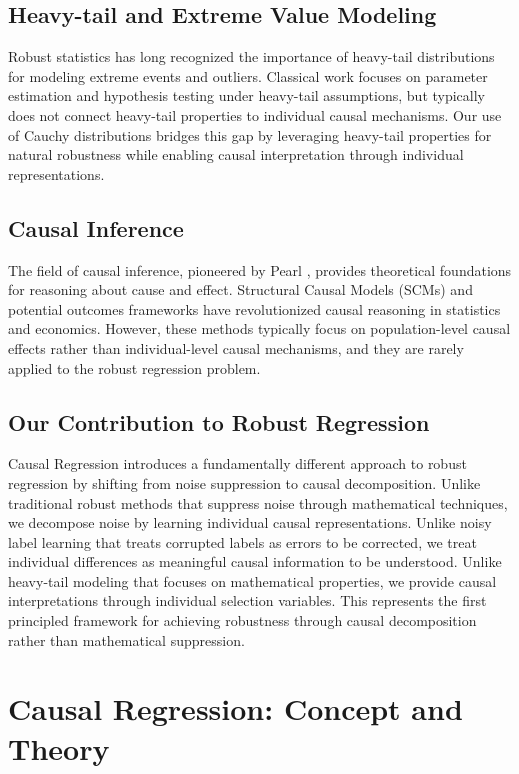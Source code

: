 \documentclass[conference]{IEEEtran}
\begin{document}
\subsection{Heavy-tail and Extreme Value Modeling}
Robust statistics has long recognized the importance of heavy-tail distributions for modeling extreme events and outliers. Classical work focuses on parameter estimation and hypothesis testing under heavy-tail assumptions, but typically does not connect heavy-tail properties to individual causal mechanisms. Our use of Cauchy distributions bridges this gap by leveraging heavy-tail properties for natural robustness while enabling causal interpretation through individual representations.

\subsection{Causal Inference}
The field of causal inference, pioneered by Pearl \cite{pearl2009causality}, provides theoretical foundations for reasoning about cause and effect. Structural Causal Models (SCMs) \cite{spirtes2000causation} and potential outcomes frameworks \cite{imbens2015causal} have revolutionized causal reasoning in statistics and economics. However, these methods typically focus on population-level causal effects rather than individual-level causal mechanisms, and they are rarely applied to the robust regression problem.

\subsection{Our Contribution to Robust Regression}
Causal Regression introduces a fundamentally different approach to robust regression by shifting from noise suppression to causal decomposition. Unlike traditional robust methods that suppress noise through mathematical techniques, we decompose noise by learning individual causal representations. Unlike noisy label learning that treats corrupted labels as errors to be corrected, we treat individual differences as meaningful causal information to be understood. Unlike heavy-tail modeling that focuses on mathematical properties, we provide causal interpretations through individual selection variables. This represents the first principled framework for achieving robustness through causal decomposition rather than mathematical suppression.

\section{Causal Regression: Concept and Theory}
\label{sec:concept}
\end{document}
